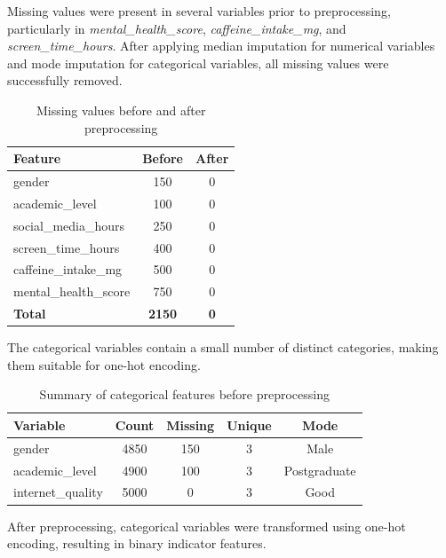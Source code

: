 Missing values were present in several variables prior to preprocessing, particularly in \textit{mental\_health\_score}, \textit{caffeine\_intake\_mg}, and \textit{screen\_time\_hours}. After applying median imputation for numerical variables and mode imputation for categorical variables, all missing values were successfully removed.

\begin{table}[t]
\centering
\caption{Missing values before and after preprocessing}
\begin{tabular}{lcc}
\toprule
\textbf{Feature} & \textbf{Before} & \textbf{After} \\
\midrule
gender & 150 & 0 \\
academic\_level & 100 & 0 \\
social\_media\_hours & 250 & 0 \\
screen\_time\_hours & 400 & 0 \\
caffeine\_intake\_mg & 500 & 0 \\
mental\_health\_score & 750 & 0 \\
\midrule
\textbf{Total} & \textbf{2150} & \textbf{0} \\
\bottomrule
\end{tabular}
\end{table}

The categorical variables contain a small number of distinct categories, making them suitable for one-hot encoding.

\begin{table}[t]
\centering
\caption{Summary of categorical features before preprocessing}
\begin{tabular}{lcccc}
\toprule
\textbf{Variable} & \textbf{Count} & \textbf{Missing} & \textbf{Unique} & \textbf{Mode} \\
\midrule
gender & 4850 & 150 & 3 & Male \\
academic\_level & 4900 & 100 & 3 & Postgraduate \\
internet\_quality & 5000 & 0 & 3 & Good \\
\bottomrule
\end{tabular}
\end{table}

After preprocessing, categorical variables were transformed using one-hot encoding, resulting in binary indicator features.

